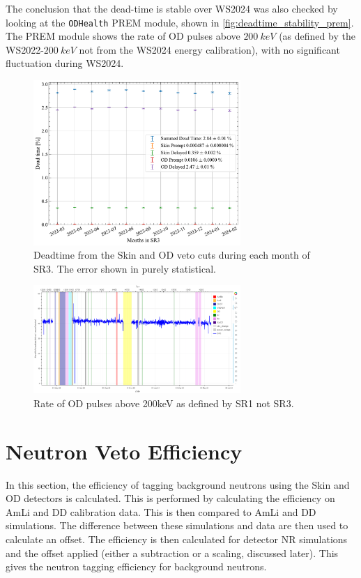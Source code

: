 The conclusion that the dead-time is stable over WS2024 was also checked by looking at the \lstinline{ODHealth} PREM module, shown in \autoref{fig:deadtime_stability_prem}.
The PREM module shows the rate of OD pulses above $200~keV$ (as defined by the WS2022-$200~keV$ not from the WS2024 energy calibration), with no significant fluctuation during WS2024.
\begin{figure}
	\centering
	\includegraphics[width=0.7\textwidth]{figures/VetoEfficiency/SR3DeadTimeAll_expoFunc.pdf}
	\caption{Deadtime from the Skin and OD veto cuts during each month of SR3. The error shown in purely statistical.}
	\label{fig:deadtime_stability}
\end{figure}
\begin{figure}
	\centering
	\includegraphics[width=0.7\textwidth]{figures/VetoEfficiency/prem_od_stability.png}
	\caption{Rate of OD pulses above 200keV as defined by SR1 not SR3.}
	\label{fig:deadtime_stability_prem}
\end{figure}

\section{Neutron Veto Efficiency}\label{sec:efficiency}
In this section, the efficiency of tagging background neutrons using the Skin and OD detectors is calculated.
This is performed by calculating the efficiency on AmLi and DD calibration data.
This is then compared to AmLi and DD simulations.
The difference between these simulations and data are then used to calculate an offset.
The efficiency is then calculated for detector NR simulations and the offset applied (either a subtraction or a scaling, discussed later).
This gives the neutron tagging efficiency for background neutrons.
